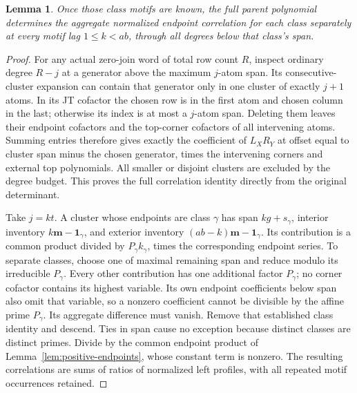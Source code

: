 \documentclass[11pt,a4paper]{amsart}
\numberwithin{equation}{section}
\theoremstyle{plain}
\newtheorem{lemma}[theorem]{Lemma}
\theoremstyle{definition}
\begin{document}
\begin{lemma}\label{lem:class-correlation}
Once those class motifs are known, the full parent polynomial determines the aggregate normalized endpoint correlation for each class separately at every motif lag \(1\le k<ab\), through all degrees below that class's span.
\end{lemma}
\begin{proof}
For any actual zero-join word of total row count \(R\), inspect ordinary degree \(R-j\) at a generator above the maximum \(j\)-atom span.  Its consecutive-cluster expansion can contain that generator only in one cluster of exactly \(j+1\) atoms.  In its JT cofactor the chosen row is in the first atom and chosen column in the last; otherwise its index is at most a \(j\)-atom span.  Deleting them leaves their endpoint cofactors and the top-corner cofactors of all intervening atoms.  Summing entries therefore gives exactly the coefficient of \(L_XR_Y\) at offset equal to cluster span minus the chosen generator, times the intervening corners and external top polynomials.  All smaller or disjoint clusters are excluded by the degree budget.  This proves the full correlation identity directly from the original determinant.

Take \(j=kt\).  A cluster whose endpoints are class \(\gamma\) has span \(kg+s_\gamma\), interior inventory \(k\mathbf m-\mathbf1_\gamma\), and exterior inventory \((ab-k)\mathbf m-\mathbf1_\gamma\).  Its contribution is a common product divided by \(P_\gamma k_\gamma\), times the corresponding endpoint series.  To separate classes, choose one of maximal remaining span and reduce modulo its irreducible \(P_\gamma\).  Every other contribution has one additional factor \(P_\gamma\); no corner cofactor contains its highest variable.  Its own endpoint coefficients below span also omit that variable, so a nonzero coefficient cannot be divisible by the affine prime \(P_\gamma\).  Its aggregate difference must vanish.  Remove that established class identity and descend.  Ties in span cause no exception because distinct classes are distinct primes.  Divide by the common endpoint product of Lemma~\ref{lem:positive-endpoints}, whose constant term is nonzero.  The resulting correlations are sums of ratios of normalized left profiles, with all repeated motif occurrences retained.
\end{proof}
\end{document}

